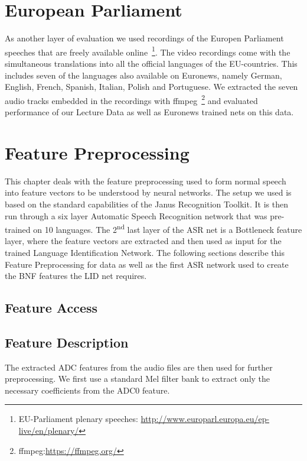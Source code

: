 \section{European Parliament}
\label{sec:LITasks:EU}

As another layer of evaluation we used recordings of the Europen Parliament speeches that are freely available online~\footnote{EU-Parliament plenary speeches: \url{http://www.europarl.europa.eu/ep-live/en/plenary/}}. The video recordings come with the simultaneous translations into all the official languages of the EU-countries. This includes seven of the languages also available on Euronews, namely German, English, French, Spanish, Italian, Polish and Portuguese. We extracted the seven audio tracks embedded in the recordings with ffmpeg~\footnote{ffmpeg:\url{https://ffmpeg.org/}} and evaluated performance of our Lecture Data as well as Euronews trained nets on this data.

\section{Feature Preprocessing}
\label{ch:FP}

This chapter deals with the feature preprocessing used to form normal speech into feature vectors to be understood by neural networks. The setup we used is based on the standard capabilities of the Janus Recognition Toolkit. It is then run through a six layer Automatic Speech Recognition network that was pre-trained on 10 languages. The 2\textsuperscript{nd} last layer of the ASR net is a Bottleneck feature layer, where the feature vectors are extracted and then used as input for the trained Language Identification Network. The following sections describe this Feature Preprocessing for data as well as the first ASR network used to create the BNF features the LID net requires.

\subsection{Feature Access}
\label{sec:FP:FA}

\subsection{Feature Description}
\label{sec:FP:FD}
The extracted ADC features from the audio files are then used for further preprocessing. We first use a standard Mel filter bank to extract only the necessary coefficients from the ADC0 feature. 

